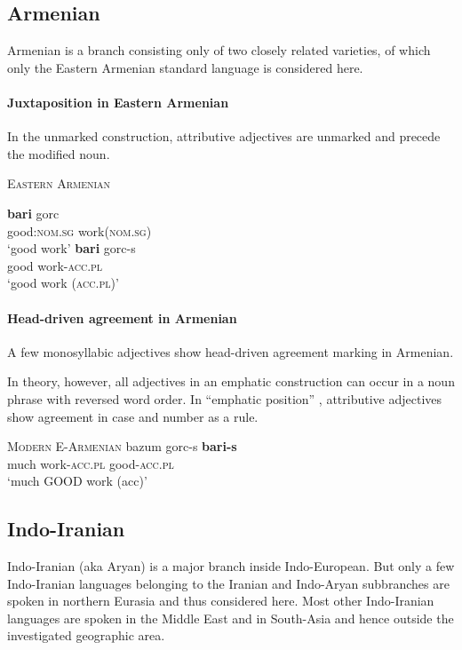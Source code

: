 \subsection{Armenian}
Armenian is a branch consisting only of two closely related varieties, of which only the Eastern Armenian standard language is considered here.

\paragraph{Juxtaposition in Eastern Armenian} 
In the unmarked construction, attributive adjectives are unmarked and precede the modified noun.
\begin{exe}
\ex \textsc{Eastern Armenian} \citep{ajello1998}
\begin{xlist}
\ex 
\gll	\textbf{bari} gorc\\
	good:\textsc{nom.sg} work(\textsc{nom.sg})\\
\glt	‘good work’
\ex 
\gll	\textbf{bari} gorc-s\\
	good work-\textsc{acc.pl}\\
\glt	‘good work (\textsc{acc.pl})’
\end{xlist}
\end{exe}

\paragraph{Head-driven agreement in Armenian}
A few monosyllabic adjectives show head-driven agreement marking in Armenian. 

In theory, however, all adjectives in an emphatic construction can occur in a noun phrase with reversed word order. In “emphatic position” \cite[224]{ajello1998}, attributive adjectives show agreement in case and number as a rule.
\begin{exe}
\ex \textsc{Modern E-Armenian} \cite[224]{ajello1998}
\gll	bazum gorc-s \textbf{bari-s}\\
	much work-\textsc{acc.pl} good-\textsc{acc.pl}\\
\glt	‘much GOOD work (acc)’
\end{exe}

\subsection{Indo-Iranian}
Indo-Iranian (aka Aryan) is a major branch inside Indo-European. But only a few Indo-Iranian languages belonging to the Iranian and Indo-Aryan subbranches are spoken in northern Eurasia and thus considered here. Most other Indo-Iranian languages are spoken in the Middle East and in South-Asia and hence outside the investigated geographic area. 

